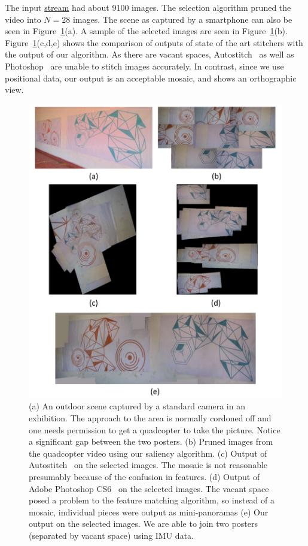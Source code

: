 \documentclass[10pt,twocolumn,letterpaper]{article}
\begin{document}
The input \href{videos/orangeBlue.avi}{stream} had about 9100 images. The
selection algorithm pruned the video into $N=28$ images. The scene as captured by a smartphone can also be seen in
Figure~\ref{fig:results1}(a). A sample of the
selected images are seen in Figure~\ref{fig:results1}(b).
Figure~\ref{fig:results1}(c,d,e) shows the comparison of outputs of state
of the art stitchers with the output of our algorithm. As there are vacant
spaces, Autostitch~\cite{autostitch} as well as Photoshop~\cite{photoshop} are
unable to stitch images accurately. In contrast, since we use positional data, our output is an acceptable mosaic, and shows
an orthographic view. 

\begin{figure}[h!]
\centering
\includegraphics[width=0.85\linewidth]{figures/orange_blue.pdf}
\caption{(a) An outdoor scene captured by a standard camera in an
  exhibition. The approach to the area is normally cordoned off and one
  needs permission to get a quadcopter to take the picture.  Notice a
  significant gap between the two posters.  (b) Pruned images from the
  quadcopter video using our saliency algorithm. (c) Output of
  Autostitch~\cite{autostitch} on the selected images. The mosaic is not
  reasonable presumably because of the confusion in features. (d) Output of Adobe
  Photoshop CS6~\cite{photoshop} on the selected images. The vacant space posed
  a problem to the feature matching algorithm, so instead of a mosaic,
  individual pieces were output as mini-panoramas (e) Our output on
  the selected images. We are able to join two posters (separated by
  vacant space) using IMU data.}
\label{fig:results1}
\end{figure}
\end{document}
